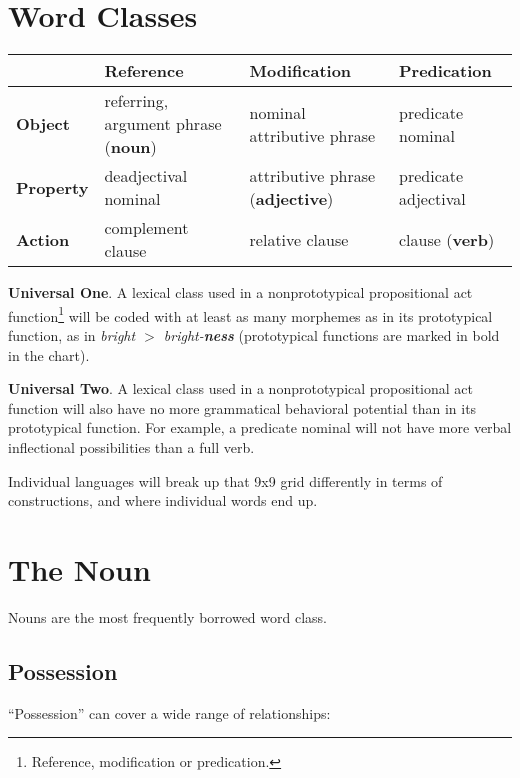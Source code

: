 \documentclass[11pt]{article}
\newcommand{\LL}[1]{\textbf{#1}}  %
\begin{document}
\section{Word Classes}

\begin{center}
  \small
  \begin{tabular}{|l|l|l|l|}
    \hline
    & \LL{Reference} & \LL{Modification} & \LL{Predication} \\
    \hline
\LL{Object} & referring, argument phrase (\LL{noun}) & nominal attributive phrase &
                                                                   predicate
                                                                   nominal \\
    \hline
\LL{Property} & deadjectival nominal & attributive phrase (\LL{adjective}) & predicate adjectival\\
    \hline
\LL{Action} & complement clause & relative clause & clause (\LL{verb})\\
    \hline
  \end{tabular}
\end{center}

\LL{Universal One}. A lexical class used in a nonprototypical
propositional act function\footnote{Reference, modification or
predication.} will be coded with at least as many morphemes as in
its prototypical function, as in \textit{bright $>$ bright-\LL{ness}}
(prototypical functions are marked in bold in the chart).

\LL{Universal Two}. A lexical class used in a nonprototypical
propositional act function will also have no more grammatical
behavioral potential than in its prototypical function. For example, a
predicate nominal will not have more verbal inflectional possibilities
than a full verb.

Individual languages will break up that 9x9 grid differently in terms
of constructions, and where individual words end up.


\section{The Noun}
Nouns are the most frequently borrowed word class.

\subsection{Possession}
``Possession'' can cover a wide range of relationships:
\end{document}
